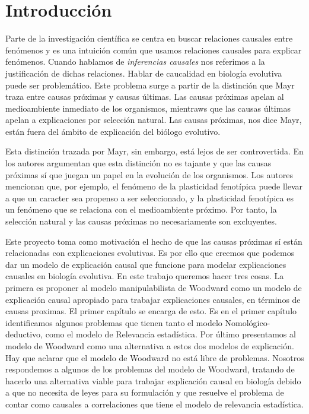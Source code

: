 
\chapter*{Introducción}


\noindent Parte de la investigación científica se centra en buscar relaciones causales entre fenómenos y es una intuición común que usamos relaciones causales para explicar fenómenos. Cuando hablamos de \textit{inferencias causales} nos referimos a la justificación de dichas relaciones. Hablar de caucalidad en biología evolutiva puede ser problemático. Este problema surge a partir de la distinción que Mayr \cite{Mayr1998} traza entre causas próximas y causas últimas. Las causas próximas apelan al medioambiente inmediato de los organismos, mientraws que las causas últimas apelan a explicaciones por selección natural. Las causas próximas, nos dice Mayr, están fuera del ámbito de explicación del biólogo evolutivo.

Esta distinción trazada por Mayr, sin embargo, está lejos de ser controvertida. En \cite{Laland2011} los autores argumentan que esta distinción no es tajante y que las causas próximas sí que juegan un papel en la evolución de los organismos. Los autores mencionan que, por ejemplo, el fenómeno de la plasticidad fenotípica puede llevar a que un caracter sea propenso a ser seleccionado, y la plasticidad fenotípica es un fenómeno que se relaciona con el medioambiente próximo. Por tanto, la selección natural y las causas próximas no necesariamente son excluyentes.

Este proyecto toma como motivación el hecho de que las causas próximas sí están relacionadas con explicaciones evolutivas. Es por ello que creemos que podemos dar un modelo de explicación causal que funcione para modelar explicaciones causales en biología evolutiva. En este trabajo queremos hacer tres cosas. La primera es proponer al modelo manipulabilista de Woodward  \cite{Woodward2000, Woodward2003} como un modelo de explicación causal apropiado para trabajar explicaciones causales, en términos de causas proximas. El primer capítulo se encarga de esto. Es en el primer capítulo identificamos algunos problemas que tienen tanto el modelo Nomológico-deductivo, como el modelo de Relevancia estadística. Por último presentamos al modelo de Woodward como una alternativa a estos dos modelos de explicación. Hay que aclarar que el modelo de Woodward no está libre de problemas. Nosotros respondemos a algunos de los problemas del modelo de Woodward, tratando de hacerlo una alternativa viable para trabajar explicación causal en biología debido a que no necesita de leyes para su formulación y que resuelve el problema de contar como causales a correlaciones que tiene el modelo de relevancia estadística.

